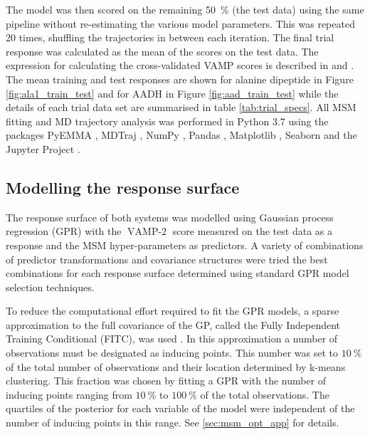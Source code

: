 The model was then scored on the remaining \SI{50}{\percent} (the test data) using the same pipeline without re-estimating the various model parameters. This was repeated $20$ times, shuffling the trajectories in between each iteration.  The final trial response was calculated as the mean of the scores on the test data. The expression for calculating the cross-validated VAMP scores is described in \cite{mcgibbonVariationalCrossvalidationSlow2015} and \cite{wuVariationalApproachLearning2019}.  The mean training and test responses are shown for alanine dipeptide in Figure \ref{fig:ala1_train_test} and for AADH in Figure \ref{fig:aad_train_test} while the details of each trial data set are summarised in table \ref{tab:trial_specs}. All MSM fitting and MD trajectory analysis was performed in Python 3.7 using the packages PyEMMA \cite{schererPyEMMASoftwarePackage2015a}, MDTraj \cite{mcgibbonMDTrajModernOpen2015}, NumPy \cite{waltNumPyArrayStructure2011}, Pandas \cite{mckinneyPandasFoundationalPython2011}, Matplotlib \cite{hunterMatplotlib2DGraphics2007},  Seaborn \cite{michaelwaskomMwaskomSeabornV02020} and the Jupyter Project \cite{kluyverJupyterNotebooksPublishing2016}. 

\subsection{Modelling the response surface}\label{sec:rsm}
The response surface of both systems was modelled using Gaussian process regression (GPR) with the $\operatorname{VAMP-2}$ score measured on the test data as a response and the MSM hyper-parameters as predictors. A variety of combinations of predictor transformations and covariance structures were tried the best combinations for each response surface determined using standard GPR model selection techniques. 

To reduce the computational effort required to fit the GPR models, a sparse approximation to the full covariance of the GP, called the Fully Independent Training Conditional (FITC), was used \cite{quinonero-candelaUnifyingViewSparse2005}. In this approximation a number of observations must be designated as inducing points. This number was set to $\SI{10}{\percent}$ of the total number of observations and their location determined by k-means clustering. This fraction was chosen by fitting a GPR with the number of inducing points ranging from $\SI{10}{\percent}$ to $\SI{100}{\percent}$ of the total observations. The quartiles of the posterior for each variable of the model were independent of the number of inducing points in this range. See \ref{sec:msm_opt_app} for details. 

